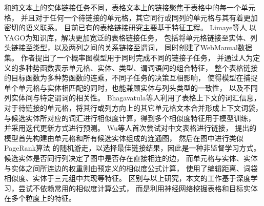 和纯文本上的实体链接任务不同，表格文本上的链接聚焦于表格中的每一个单元格，
并且对于任何一个待链接的单元格，其它同行或同列的单元格与其有着更加密切的语义联系。
目前已有的表格链接研究主要基于特征工程。
Limaye等人\cite{limaye2010annotating} 以YAGO为知识库，解决更加宽泛的表格链接任务，
包括将单元格链接至实体、列头链接至类型，以及两列之间的关系链接至谓词，
同时创建了WebManual数据集。
作者提出了一个概率图模型用于同时完成不同的链接子任务，
并通过人为定义的多种势函数表示单元格、实体、类型、谓词语间的组合特征，
整个表格链接的目标函数为多种势函数的连乘，不同子任务的决策互相影响，
使得模型在捕捉单个单元格与实体相匹配的同时，也能兼顾实体与列头类型的一致性，
以及不同列实体间与特定谓词的相关性。
Bhagavatula等人\cite{bhagavatula2015tabel}利用了表格上下文的词汇信息，
对于待链接的单元格，将其行或列方向上的其它单元格文本合并形成上下文词袋，
与候选实体所对应的词汇进行相似度计算，得到多个相似度特征用于模型训练，
并采用迭代更新方式进行预测。
Wu等人\cite{wu2016entity}首次尝试对中文表格进行链接，
提出的模型首先构建由单元格和所有候选实体组成的连通图，
然后在图中进行类似PageRank算法\cite{page1999pagerank}
的随机游走，以选择最佳链接结果，因此是一种非监督学习方式。
候选实体是否同行列决定了图中是否存在直接相连的边，
而单元格与实体、实体与实体之间所连边的权重则由预定义的相似度公式计算，
使用了编辑距离、词袋相似度、实体于三元组中共现等特征。
区别与以上研究，本文的工作基于深度学习，尝试不依赖常用的相似度计算公式，
而是利用神经网络挖掘表格和目标实体在多个粒度上的特征。


